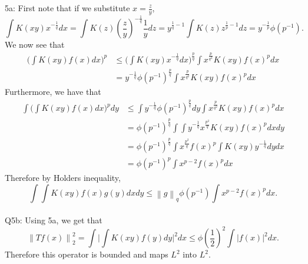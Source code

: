 \documentclass[letterpaper]{article}
\newcommand{\norm}[1]{\left\lVert#1\right\rVert}
\begin{document}
 \noindent 5a: 
First note that if we substitute $x = \frac{z}{y}$,  $$\int K(xy)x^{-\frac{1}{q}} dx = \int K(z)( \frac{z}{y})^{-\frac{1}{q}} \frac{1}{y}dz = y^{\frac{1}{q} -1} \int K(z) z^{\frac{1}{p}-1} dz = y^{- \frac{1}{p}} \phi(p^{-1}).$$
We now see that \begin{align*}
    \Big( \int K(xy)f(x)dx \Big)^p & \leq \Big( \int K(xy)x^{-\frac{1}{q}} dx \Big)^{\frac{p}{q}} \int x^{\frac{p}{q^2}}K(xy) {f(x)}^p dx \tag{by Holders inequality}
    \\ &=y^{-\frac{1}{q}}\phi(p^{-1})^{\frac{p}{q}}\int x^{\frac{p}{q^2}}K(xy) {f(x)}^p dx \tag{by above}
\end{align*}
Furthermore, we have that 
\begin{align*}
    \int \Big( \int K(xy)f(x)dx \Big)^p dy & \leq \int y^{-\frac{1}{q}} \phi(p^{-1})^\frac{p}{q} dy \int x^{\frac{p}{q^2}}K(xy) {f(x)}^p dx \tag{by tonelli and above}
    \\ & = \phi(p^{-1})^\frac{p}{q} \int \int y^{-\frac{1}{q}} x^{\frac{p^2}{q}}K(xy)f(x)^p dx dy 
    \\ & = \phi(p^{-1})^\frac{p}{q} \int x^{\frac{p^2}{q}}f(x)^p \int K(xy) y^{-\frac{1}{q}} dy dx 
    \\ & = \phi(p^{-1})^p \int x^{p-2} f(x)^p dx 
\end{align*}
Therefore by Holders inequality, 
$$\int \int K(xy)f(x)g(y) dx dy \leq \norm{g}_q \phi(p^{-1}) \int x^{p-2} f(x)^p dx.$$
\newline \\ Q5b: Using 5a, we get that $$\norm{Tf(x)}^2_2 = \int \Big| \int K(xy)f(y)dy \Big|^2 dx \leq \phi(\frac{1}{2})^2 \int |f(x)|^2 dx. $$
Therefore this operator is bounded and maps $L^2$ into $L^2$. 
\end{document}
